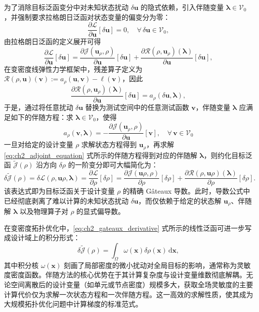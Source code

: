 为了消除目标泛函变分中对未知状态扰动 $\delta\boldsymbol{u}$ 的隐式依赖，引入伴随变量 $\boldsymbol{\lambda}\in\mathcal{V}_0$，并强制要求拉格朗日泛函对状态变量的偏变分为零：
\[
\frac{\partial\mathcal{L}}{\partial\boldsymbol{u}}[\delta\boldsymbol{u}] = 0, \quad \forall\,\delta\boldsymbol{u}\in\mathcal{V}_0,
\]
由拉格朗日泛函的定义展开可得
\[
\frac{\partial\mathcal{L}}{\partial\boldsymbol{u}}[\delta\boldsymbol{u}] = \frac{\partial\mathcal{J}( \boldsymbol{u}_\rho,\rho)}{\partial\boldsymbol{u}}[\delta\boldsymbol{u}] + \frac{\partial\mathcal{R}(\rho,\boldsymbol{u}_\rho)(\boldsymbol\lambda)}{\partial\boldsymbol{u}}[\delta\boldsymbol{u}],
\]
在变密度线弹性力学框架中，残差算子定义为 $\mathcal{R}(\rho,\boldsymbol{u})(\boldsymbol{v}) := a_\rho(\boldsymbol{u},\boldsymbol{v}) - \ell(\boldsymbol{v})$，因此
\[
\frac{\partial\mathcal{R}(\rho,\boldsymbol{u}_\rho)(\boldsymbol\lambda)}{\partial\boldsymbol{u}}[\delta\boldsymbol{u}] = a_\rho(\delta\boldsymbol{u},\boldsymbol{\lambda}),
\]
于是，通过将任意扰动 $\delta\boldsymbol{u}$ 替换为测试空间中的任意测试函数 $\boldsymbol{v}$，伴随变量 $\boldsymbol{\lambda}$ 应满足如下的伴随方程：求 $\boldsymbol{\lambda}\in\mathcal{V}_0$，使得
\begin{equation}
	a_\rho(\boldsymbol{v},\boldsymbol{\lambda}) = -\frac{\partial\mathcal{J}( \boldsymbol{u}_\rho,\rho)}{\partial\boldsymbol{u}}[\boldsymbol{v}],\quad \forall\,\boldsymbol{v}\in\mathcal{V}_0
	\label{eq:ch2_adjoint_equation}
\end{equation}
一旦对给定的设计变量 $\rho$ 求解状态方程得到 $\boldsymbol{u}_\rho$​，再求解 \eqref{eq:ch2_adjoint_equation} 式所示的伴随方程得到对应的伴随解 $\boldsymbol{\lambda}$，则约化目标泛函 $\tilde{\mathcal{J}}(\rho)$ 沿方向 $\delta\rho$ 的一阶变分即可大幅简化为：
\begin{equation} 
	\delta\tilde{\mathcal{J}}(\rho) = \delta\mathcal{L}(\rho, \boldsymbol{u}\rho, \boldsymbol{\lambda}) = \frac{\partial\mathcal{L}}{\partial\rho}[\delta\rho] = \frac{\partial\mathcal{J}(\boldsymbol{u}\rho, \rho)}{\partial\rho}[\delta\rho] + \frac{\partial\mathcal{R}(\rho, \boldsymbol{u}\rho)(\boldsymbol{\lambda})}{\partial\rho}[\delta\rho].
	\label{eq:ch2_gateaux_derivative}
\end{equation}
该表达式即为目标泛函关于设计变量 $\rho$ 的精确 Gâteaux 导数。此时，导数公式中已经彻底剥离了难以计算的未知状态扰动 $\delta\boldsymbol{u}$，而仅依赖于给定的状态解 $\boldsymbol{u}_\rho$、伴随解 $\boldsymbol{\lambda}$ 以及物理算子对 $\rho$ 的显式偏导数。

在变密度拓扑优化中，\eqref{eq:ch2_gateaux_derivative} 式所示的线性泛函可进一步写成设计域上的积分形式：
\[
\delta\tilde{\mathcal{J}}(\rho) = \int_{\Omega} \omega(\boldsymbol{x}) \delta\rho(\boldsymbol{x}) \,\mathrm{d}\boldsymbol{x},
\]
其中积分核 $\omega(\boldsymbol{x})$ 刻画了局部密度的微小扰动对全局目标的影响，通常称为灵敏度密度函数。伴随方法的核心优势在于其计算复杂度与设计变量维数彻底解耦。无论空间离散后的设计变量（如单元或节点密度）规模多大，获取全场灵敏度的主要计算代价仅为求解一次状态方程和一次伴随方程。这一高效的求解性质，使其成为大规模拓扑优化问题中计算梯度的标准范式。



